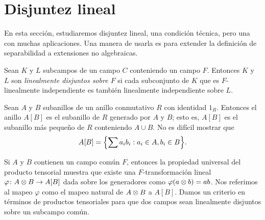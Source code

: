 \section{Disjuntez lineal}

En esta sección, estudiaremos disjuntez lineal, una condición técnica, pero una con muchas aplicaciones. Una manera de usarla es para extender la definición de separabilidad a extensiones no algebraicas.

\begin{definition}
  Sean $K$ y $L$ subcampos de un campo $C$ conteniendo un campo $F$. Entonces $K$ y $L$ son \emph{linealmente disjuntos sobre $F$} si cada subconjunto de $K$ que es $F$-linealmente independiente es también linealmente independiente sobre $L$.
\end{definition}

Sean $A$ y $B$ subanillos de un anillo conmutativo $R$ con identidad $1_R$. Entonces el anillo $A[B]$ es el subanillo de $R$ generado por $A$ y $B$; esto es, $A[B]$ es el subanillo más pequeño de $R$ conteniendo $A\cup B$. No es difícil mostrar que
  \[
    A[B] = \Bigl\{ \sum a_ib_i : a_i \in A, b_i \in B \Bigr\}.
  \]

Si $A$ y $B$ contienen un campo común $F$, entonces la propiedad universal del producto tensorial muestra que existe una $F$-transformación lineal $\varphi\colon A \otimes B \to A[B]$ dada sobre los generadores como $\varphi(a\otimes b) = ab$. Nos referimos al mapeo $\varphi$ como el mapeo natural de $A \otimes B$ a $A[B]$. Damos un criterio en términos de productos tensoriales para que dos campos sean linealmente disjuntos sobre un subcampo común.

